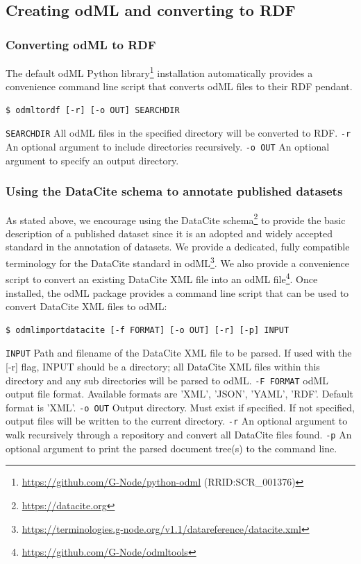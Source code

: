 \documentclass{article}
\begin{document}
\subsection{Creating odML and converting to RDF} \label{sec:odml_to_rdf}

\subsubsection{Converting odML to RDF} \label{sec:odml_conversion}
The default odML Python library\footnote{\url{https://github.com/G-Node/python-odml} (RRID:SCR\_001376)} installation automatically provides a convenience command line script that converts odML files to their RDF pendant.

\begin{lstlisting}[label=lst:conversion_script, caption=odML to RDF conversion Python script]
$ odmltordf [-r] [-o OUT] SEARCHDIR
\end{lstlisting}

\texttt{SEARCHDIR} All odML files in the specified directory will be converted to RDF.
\texttt{-r} An optional argument to include directories recursively.
\texttt{-o OUT} An optional argument to specify an output directory.

\subsubsection{Using the DataCite schema to annotate published datasets} \label{sec:datacite}
As stated above, we encourage using the DataCite schema\footnote{\url{https://datacite.org}} to provide the basic description of a published dataset since it is an adopted and widely accepted standard in the annotation of datasets. We provide a dedicated, fully compatible terminology for the DataCite standard in odML\footnote{\url{https://terminologies.g-node.org/v1.1/datareference/datacite.xml}}. We also provide a convenience script to convert an existing DataCite XML file into an odML file\footnote{\url{https://github.com/G-Node/odmltools}}. Once installed, the odML package provides a command line script that can be used to convert DataCite XML files to odML:

\begin{lstlisting}[label=lst:datacite_script, caption=Datacite import Python script]
$ odmlimportdatacite [-f FORMAT] [-o OUT] [-r] [-p] INPUT
\end{lstlisting}

\texttt{INPUT} Path and filename of the DataCite XML file to be parsed. If used with the [-r] flag, INPUT should be a directory; all DataCite XML files within this directory and any sub directories will be parsed to odML.
\texttt{-F FORMAT} odML output file format. Available formats are 'XML', 'JSON', 'YAML', 'RDF'. Default format is 'XML'.
\texttt{-o OUT} Output directory. Must exist if specified. If not specified, output files will be written to the current directory.
\texttt{-r} An optional argument to walk recursively through a repository and convert all DataCite files found.
\texttt{-p} An optional argument to print the parsed document tree(s) to the command line.
\end{document}
